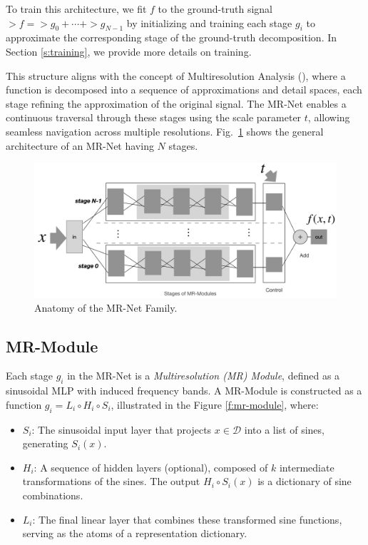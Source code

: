 To train this architecture, we fit \( f \) to the ground-truth signal \( \gt{f} = \gt{g}_0 + \cdots + \gt{g}_{N-1} \) by initializing and training each stage \( g_i \) to approximate the corresponding stage of the ground-truth decomposition. In Section \ref{s:training}, we provide more details on training.

This structure aligns with the concept of Multiresolution Analysis (\cite{mallat-mr89}), where a function is decomposed into a sequence of approximations and detail spaces, each stage refining the approximation of the original signal. The MR-Net enables a continuous traversal through these stages using the scale parameter \(t\), allowing seamless navigation across multiple resolutions. Fig.~\ref{f:mrnet-arch} shows the general architecture of an MR-Net having \(N\) stages.

\begin{figure}[!h]
\centering
\includegraphics[width=0.9\linewidth]{img/ch4/mr-net-stages-v2.png}
\caption{Anatomy of the MR-Net Family.}
\label{f:mrnet-arch}
\end{figure}


\subsection{MR-Module}
\label{s-mr-module}

Each stage \( g_i \) in the MR-Net is a \textit{Multiresolution (MR) Module}, defined as a sinusoidal MLP with induced frequency bands. A MR-Module is constructed as a function \( g_i = L_i \circ H_i \circ S_i \), illustrated in the Figure \ref{f:mr-module}, where:

\begin{itemize}
    \item \( S_i \): The sinusoidal input layer that projects \( x \in \mathcal{D} \) into a list of sines, generating \( S_i(x) \).
    \item \( H_i \): A sequence of hidden layers (optional), composed of \( k \) intermediate transformations of the sines. The output $H_i\circ S_i(x)$ is a dictionary of sine combinations.
    \item \( L_i \): The final linear layer that combines these transformed sine functions, serving as the atoms of a representation dictionary.
\end{itemize}


